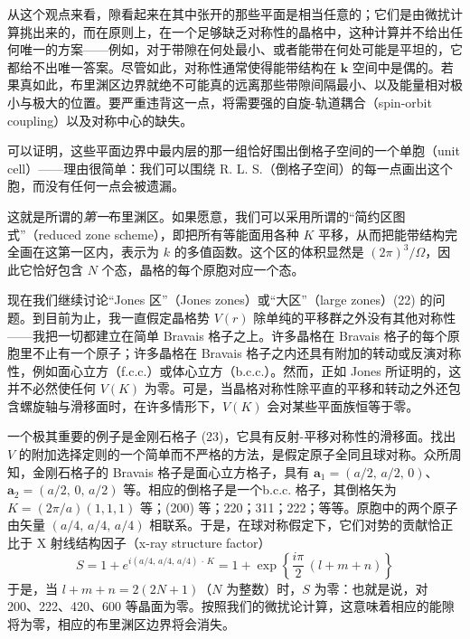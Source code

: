 从这个观点来看，隙看起来在其中张开的那些平面是相当任意的；它们是由微扰计算挑出来的，而在原则上，在一个足够缺乏对称性的晶格中，这种计算并不给出任何唯一的方案——例如，对于带隙在何处最小、或者能带在何处可能是平坦的，它都给不出唯一答案。尽管如此，对称性通常使得能带结构在 $\mathbf{k}$ 空间中是偶的。若果真如此，布里渊区边界就绝不可能真的远离那些带隙间隔最小、以及能量相对极小与极大的位置。要严重违背这一点，将需要强的自旋-轨道耦合（spin-orbit coupling）以及对称中心的缺失。

可以证明，这些平面边界中最内层的那一组恰好围出倒格子空间的一个单胞（unit cell）——理由很简单：我们可以围绕 R. L. S.（倒格子空间）的每一点画出这个胞，而没有任何一点会被遗漏。



这就是所谓的\emph{第一}布里渊区。如果愿意，我们可以采用所谓的“简约区图式”（reduced zone scheme），即把所有等能面用各种 $K$ 平移，从而把能带结构完全画在这第一区内，表示为 $k$ 的多值函数。这个区的体积显然是 $(2\pi)^3/\Omega$，因此它恰好包含 $N$ 个态，晶格的每个原胞对应一个态。

现在我们继续讨论“Jones 区”（Jones zones）或“大区”（large zones）(22) 的问题。到目前为止，我一直假定晶格势 $V(r)$ 除单纯的平移群之外没有其他对称性——我把一切都建立在简单 Bravais 格子之上。许多晶格在 Bravais 格子的每个原胞里不止有一个原子；许多晶格在 Bravais 格子之内还具有附加的转动或反演对称性，例如面心立方（f.c.c.）或体心立方（b.c.c.）。然而，正如 Jones 所证明的，这并不必然使任何 $V(K)$ 为零。可是，当晶格对称性除平直的平移和转动之外还包含螺旋轴与滑移面时，在许多情形下，$V(K)$ 会对某些平面族恒等于零。

一个极其重要的例子是金刚石格子 (23)，它具有反射-平移对称性的滑移面。找出 $V$ 的附加选择定则的一个简单而不严格的方法，是假定原子全同且球对称。众所周知，金刚石格子的 Bravais 格子是面心立方格子，具有 $\mathbf{a}_1=(a/2,\,a/2,\,0)$、$\mathbf{a}_2=(a/2,\,0,\,a/2)$ 等。相应的倒格子是一个b.c.c. 格子，其倒格矢为 $K=(2\pi/a)(1,1,1)$ 等；(200) 等；220；311；222；等等。原胞中的两个原子由矢量 $(a/4,\,a/4,\,a/4)$ 相联系。于是，在球对称假定下，它们对势的贡献恰正比于 X 射线结构因子（x-ray structure factor）
\begin{equation*}
S = 1 + e^{i(a/4,\,a/4,\,a/4)\,\cdot\,K} = 1 + \exp\left\{\frac{i\pi}{2}\,(l+m+n)\right\}
\end{equation*}
于是，当 $l+m+n=2(2N+1)$（$N$ 为整数）时，$S$ 为零：也就是说，对 200、222、420、600 等晶面为零。按照我们的微扰论计算，这意味着相应的能隙将为零，相应的布里渊区边界将会消失。

